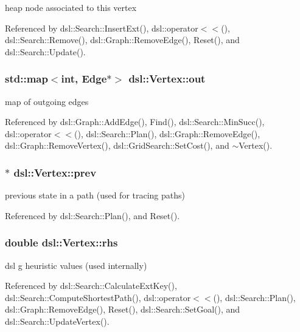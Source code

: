 heap node associated to this vertex 



Referenced by dsl\-::\-Search\-::\-Insert\-Ext(), dsl\-::operator$<$$<$(), dsl\-::\-Search\-::\-Remove(), dsl\-::\-Graph\-::\-Remove\-Edge(), Reset(), and dsl\-::\-Search\-::\-Update().

\subsubsection[{out}]{\setlength{\rightskip}{0pt plus 5cm}std\-::map$<$int, {\bf Edge}$\ast$$>$ dsl\-::\-Vertex\-::out}\label{classdsl_1_1Vertex_a8eece6b931c93f951100d2ab988c8666}


map of outgoing edges 



Referenced by dsl\-::\-Graph\-::\-Add\-Edge(), Find(), dsl\-::\-Search\-::\-Min\-Succ(), dsl\-::operator$<$$<$(), dsl\-::\-Search\-::\-Plan(), dsl\-::\-Graph\-::\-Remove\-Edge(), dsl\-::\-Graph\-::\-Remove\-Vertex(), dsl\-::\-Grid\-Search\-::\-Set\-Cost(), and $\sim$\-Vertex().

\subsubsection[{prev}]{$\ast$ dsl\-::\-Vertex\-::prev}\label{classdsl_1_1Vertex_a872a93b3aff52d54e65d2346f95f46e3}


previous state in a path (used for tracing paths) 



Referenced by dsl\-::\-Search\-::\-Plan(), and Reset().

\subsubsection[{rhs}]{\setlength{\rightskip}{0pt plus 5cm}double dsl\-::\-Vertex\-::rhs}\label{classdsl_1_1Vertex_ad9a72f64c36b5f7fa4f3521d3012a2ff}


dsl g heuristic values (used internally) 



Referenced by dsl\-::\-Search\-::\-Calculate\-Ext\-Key(), dsl\-::\-Search\-::\-Compute\-Shortest\-Path(), dsl\-::operator$<$$<$(), dsl\-::\-Search\-::\-Plan(), dsl\-::\-Graph\-::\-Remove\-Edge(), Reset(), dsl\-::\-Search\-::\-Set\-Goal(), and dsl\-::\-Search\-::\-Update\-Vertex().

